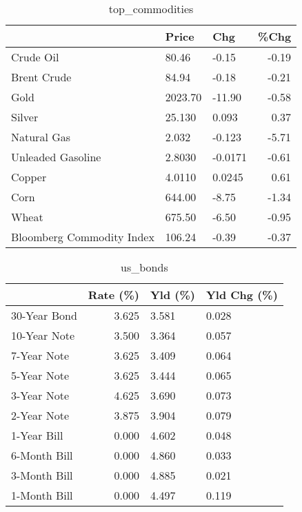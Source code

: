 \documentclass{article}%
\begin{document}
\begin{table}[htbp]%
\caption{top\_commodities}%
\centering%
\begin{adjustbox}{width=1\textwidth}%
\begin{tabular}{lllr}
\toprule
                          &   Price &     Chg &  \%Chg \\
\midrule
               Crude Oil  &   80.46 &   -0.15 & -0.19 \\
             Brent Crude  &   84.94 &   -0.18 & -0.21 \\
                    Gold  & 2023.70 &  -11.90 & -0.58 \\
                  Silver  &  25.130 &   0.093 &  0.37 \\
             Natural Gas  &   2.032 &  -0.123 & -5.71 \\
       Unleaded Gasoline  &  2.8030 & -0.0171 & -0.61 \\
                  Copper  &  4.0110 &  0.0245 &  0.61 \\
                    Corn  &  644.00 &   -8.75 & -1.34 \\
                   Wheat  &  675.50 &   -6.50 & -0.95 \\
Bloomberg Commodity Index &  106.24 &   -0.39 & -0.37 \\
\bottomrule
\end{tabular}
%
\end{adjustbox}%
\end{table}

%


\begin{table}[htbp]%
\caption{us\_bonds}%
\centering%
\begin{adjustbox}{width=1\textwidth}%
\begin{tabular}{lrll}
\toprule
             &  Rate (\%) & Yld (\%) & Yld Chg (\%) \\
\midrule
30-Year Bond &     3.625 &   3.581 &       0.028 \\
10-Year Note &     3.500 &   3.364 &       0.057 \\
 7-Year Note &     3.625 &   3.409 &       0.064 \\
 5-Year Note &     3.625 &   3.444 &       0.065 \\
 3-Year Note &     4.625 &   3.690 &       0.073 \\
 2-Year Note &     3.875 &   3.904 &       0.079 \\
 1-Year Bill &     0.000 &   4.602 &       0.048 \\
6-Month Bill &     0.000 &   4.860 &       0.033 \\
3-Month Bill &     0.000 &   4.885 &       0.021 \\
1-Month Bill &     0.000 &   4.497 &       0.119 \\
\bottomrule
\end{tabular}
%
\end{adjustbox}%
\end{table}
\end{document}
